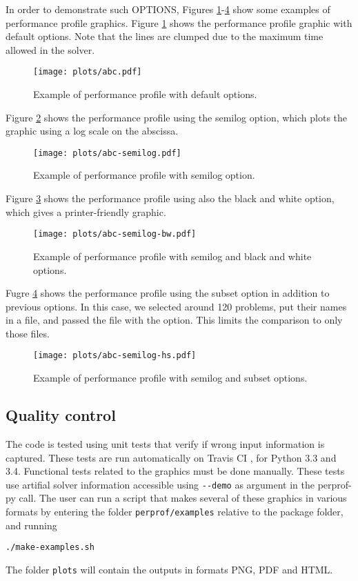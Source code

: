     In order to demonstrate such OPTIONS, Figures \ref{fig:example1}-\ref{fig:example4} show some examples of  performance profile graphics.
    Figure \ref{fig:example1} shows the performance profile graphic with default
    options. Note that the lines are clumped due to the maximum time allowed
    in the solver.
    \begin{figure}[!ht]
      \centering
      \texttt{[image: plots/abc.pdf]}
      \caption{Example of performance profile with default options.}
      \label{fig:example1}
    \end{figure}
    Figure \ref{fig:example2} shows the performance profile using the semilog
    option, which plots the graphic using a log scale on the abscissa.
    \begin{figure}[!ht]
      \centering
      \texttt{[image: plots/abc-semilog.pdf]}
      \caption{Example of performance profile with semilog option.}
      \label{fig:example2}
    \end{figure}
    Figure \ref{fig:example3} shows the performance profile using also the black
    and white option, which gives a printer-friendly graphic.
    \begin{figure}[!ht]
      \centering
      \texttt{[image: plots/abc-semilog-bw.pdf]}
      \caption{Example of performance profile with semilog and black and white
        options.}
      \label{fig:example3}
    \end{figure}
    Fugre \ref{fig:example4} shows the performance profile using the subset
    option in addition to previous options. In this case, we selected around 120
    problems, put their names in a file, and passed the file with the option.
    This limits the comparison to only those files.
    \begin{figure}[!ht]
      \centering
      \texttt{[image: plots/abc-semilog-hs.pdf]}
      \caption{Example of performance profile with semilog and subset options.}
      \label{fig:example4}
    \end{figure}

\subsection*{Quality control}

    The code is tested using unit tests that verify if wrong input information
    is captured. These tests are run automatically on Travis CI
    \cite{url:travis}, for Python 3.3 and 3.4.
    Functional tests related to the graphics must be done manually.
    These tests use artifial solver information accessible using \verb+--demo+
    as argument in the perprof-py call. The user can run a script that makes
    several of these graphics in various formats by entering the folder
    \verb+perprof/examples+ relative to the package folder, and running
\begin{verbatim}
./make-examples.sh
\end{verbatim}
    The folder \verb+plots+ will contain the outputs in formats PNG, PDF and HTML.

